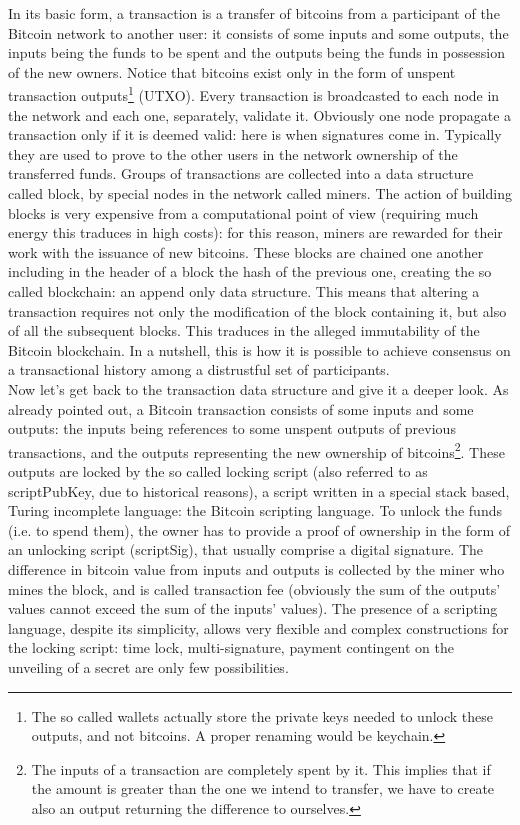\bigskip
\noindent
In its basic form, a transaction is a transfer of bitcoins from a participant of the Bitcoin network to another user: it consists of some inputs and some outputs, the inputs being the funds to be spent and the outputs being the funds in possession of the new owners. Notice that bitcoins exist only in the form of unspent transaction outputs\footnote{The so called wallets actually store the private keys needed to unlock these outputs, and not bitcoins. A proper renaming would be keychain.} (UTXO). Every transaction is broadcasted to each node in the network and each one, separately, validate it. Obviously one node propagate a transaction only if it is deemed valid: here is when signatures come in. Typically they are used to prove to the other users in the network ownership of the transferred funds. Groups of transactions are collected into a data structure called block, by special nodes in the network called miners. The action of building blocks is very expensive from a computational point of view (requiring much energy this traduces in high costs): for this reason, miners are rewarded for their work with the issuance of new bitcoins. These blocks are chained one another including in the header of a block the hash of the previous one, creating the so called blockchain: an append only data structure. This means that altering a transaction requires not only the modification of the block containing it, but also of all the subsequent blocks. This traduces in the alleged immutability of the Bitcoin blockchain. In a nutshell, this is how it is possible to achieve consensus on a transactional history among a distrustful set of participants.
\\
Now let's get back to the transaction data structure and give it a deeper look. As already pointed out, a Bitcoin transaction consists of some inputs and some outputs: the inputs being references to some unspent outputs of previous transactions, and the outputs representing the new ownership of bitcoins\footnote{The inputs of a transaction are completely spent by it. This implies that if the amount is greater than the one we intend to transfer, we have to create also an output returning the difference to ourselves.}. These outputs are locked by the so called locking script (also referred to as scriptPubKey, due to historical reasons), a script written in a special stack based, Turing incomplete language: the Bitcoin scripting language. To unlock the funds (i.e. to spend them), the owner has to provide a proof of ownership in the form of an unlocking script (scriptSig), that usually comprise a digital signature. The difference in bitcoin value from inputs and outputs is collected by the miner who mines the block, and is called transaction fee (obviously the sum of the outputs' values cannot exceed the sum of the inputs' values). The presence of a scripting language, despite its simplicity, allows very flexible and complex constructions for the locking script: time lock, multi-signature, payment contingent on the unveiling of a secret are only few possibilities.

